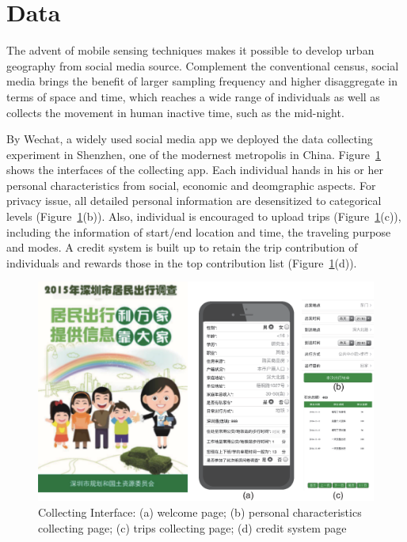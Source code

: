 \section{Data}

The advent of mobile sensing techniques makes it possible to develop urban geography from social media source. Complement the conventional census, social media brings the benefit of larger sampling frequency and higher disaggregate in terms of space and time, which reaches a wide range of individuals as well as collects the movement in human inactive time, such as the mid-night.

By Wechat, a widely used social media app we deployed the data collecting experiment in Shenzhen, one of the modernest metropolis in China. Figure~\ref{fig:app} shows the interfaces of the collecting app. Each individual hands in his or her personal characteristics from social, economic and deomgraphic aspects. For privacy issue, all detailed personal information are desensitized to categorical levels (Figure~\ref{fig:app}(b)). Also, individual is encouraged to upload trips (Figure~\ref{fig:app}(c)), including the information of start/end location and time, the traveling purpose and modes. A credit system is built up to retain the trip contribution of individuals and rewards those in the top contribution list (Figure~\ref{fig:app}(d)). 

\begin{figure}[htb!]
 \centering %
 \includegraphics[width=\columnwidth]{pictures/survey_app}
 \caption{Collecting Interface: (a) welcome page; (b) personal characteristics collecting page; (c) trips collecting page; (d) credit system page}
 \label{fig:app}
\end{figure}


